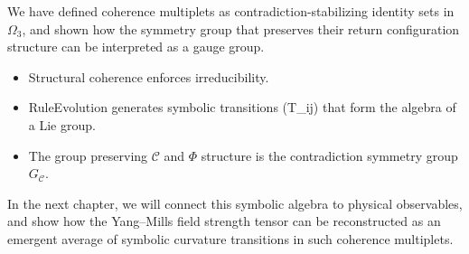 We have defined coherence multiplets as contradiction-stabilizing identity sets in $\Omega_3$, and shown how the symmetry group that preserves their return configuration structure can be interpreted as a gauge group.

\begin{itemize}
  \item Structural coherence enforces irreducibility.
  \item RuleEvolution generates symbolic transitions (T_{ij}) that form the algebra of a Lie group.
  \item The group preserving $\mathcal{C}$ and $\Phi$ structure is the contradiction symmetry group $G_\mathcal{C}$.
\end{itemize}

In the next chapter, we will connect this symbolic algebra to physical observables, and show how the Yang–Mills field strength tensor can be reconstructed as an emergent average of symbolic curvature transitions in such coherence multiplets.

